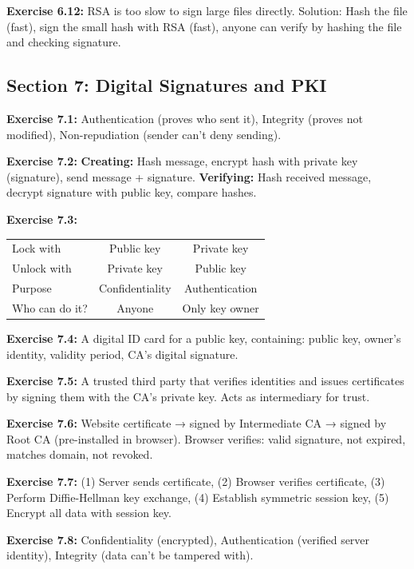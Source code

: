 \documentclass[11pt,a4paper]{report}
\begin{document}
\textbf{Exercise 6.12:}
RSA is too slow to sign large files directly. Solution: Hash the file (fast), sign the small hash with RSA (fast), anyone can verify by hashing the file and checking signature.

\subsection*{Section 7: Digital Signatures and PKI}

\textbf{Exercise 7.1:}
Authentication (proves who sent it), Integrity (proves not modified), Non-repudiation (sender can't deny sending).

\textbf{Exercise 7.2:}
\textbf{Creating:} Hash message, encrypt hash with private key (signature), send message + signature. \textbf{Verifying:} Hash received message, decrypt signature with public key, compare hashes.

\textbf{Exercise 7.3:}
\begin{center}
\begin{tabular}{|l|c|c|}
\hline
Lock with & Public key & Private key \\
Unlock with & Private key & Public key \\
Purpose & Confidentiality & Authentication \\
Who can do it? & Anyone & Only key owner \\
\hline
\end{tabular}
\end{center}

\textbf{Exercise 7.4:}
A digital ID card for a public key, containing: public key, owner's identity, validity period, CA's digital signature.

\textbf{Exercise 7.5:}
A trusted third party that verifies identities and issues certificates by signing them with the CA's private key. Acts as intermediary for trust.

\textbf{Exercise 7.6:}
Website certificate → signed by Intermediate CA → signed by Root CA (pre-installed in browser). Browser verifies: valid signature, not expired, matches domain, not revoked.

\textbf{Exercise 7.7:}
(1) Server sends certificate, (2) Browser verifies certificate, (3) Perform Diffie-Hellman key exchange, (4) Establish symmetric session key, (5) Encrypt all data with session key.

\textbf{Exercise 7.8:}
Confidentiality (encrypted), Authentication (verified server identity), Integrity (data can't be tampered with).
\end{document}
